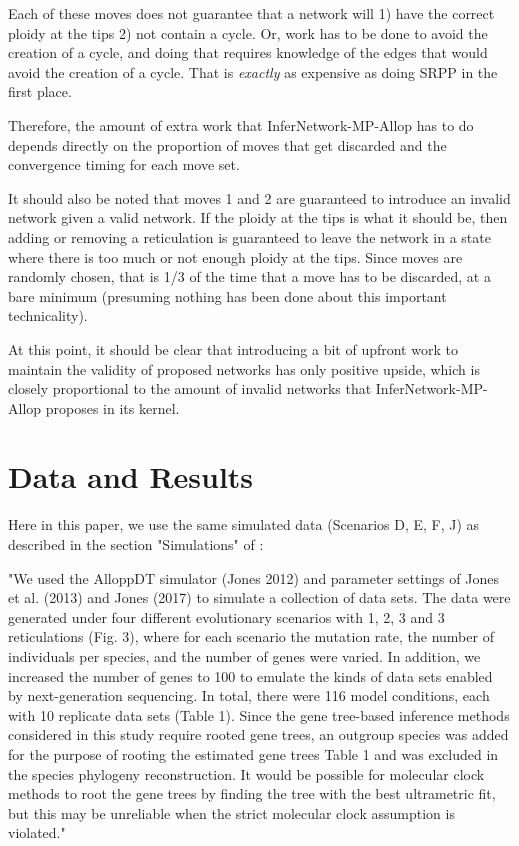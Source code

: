 \documentclass{article}
\begin{document}
Each of these moves does not guarantee that a network will 1) have the correct ploidy at the tips 2) not contain a cycle. Or, work has to be done to avoid the creation of a cycle, and doing that requires knowledge of the edges that would avoid the creation of a cycle. That is \textit{exactly} as expensive as doing SRPP in the first place.

Therefore, the amount of extra work that InferNetwork-MP-Allop has to do depends directly on the proportion of moves that get discarded and the convergence timing for each move set.

It should also be noted that moves 1 and 2 are guaranteed to introduce an invalid network given a valid network. If the ploidy at the tips is what it should be, then adding or removing a reticulation is guaranteed to leave the network in a state where there is too much or not enough ploidy at the tips. Since moves are randomly chosen, that is 1/3 of the time that a move has to be discarded, at a bare minimum (presuming nothing has been done about this important technicality).

At this point, it should be clear that introducing a bit of upfront work to maintain the validity of proposed networks has only positive upside, which is closely proportional to the amount of invalid networks that InferNetwork-MP-Allop proposes in its kernel.


\section{Data and Results}

Here in this paper, we use the same simulated data (Scenarios D, E, F, J) as described in the section "Simulations" of \cite{YanMP} :

"We used the AlloppDT simulator (Jones 2012) and parameter settings of Jones et al. (2013) and Jones (2017) to simulate a collection of data sets. The data were generated under four different evolutionary scenarios with 1, 2, 3 and 3 reticulations (Fig. 3), where for each scenario the mutation rate, the number of individuals per species, and the number of genes were varied. In addition, we increased the number of genes to 100 to emulate the kinds of data sets enabled by next-generation sequencing. In total, there were 116 model conditions, each with 10 replicate data sets (Table 1). Since the gene tree-based inference methods considered in this study require rooted gene trees, an outgroup species was added for the purpose of rooting the estimated gene trees Table 1 and was excluded in the species phylogeny reconstruction. It would be possible for molecular clock methods to root the gene trees by finding the tree with the best ultrametric fit, but this may be unreliable when the strict molecular clock assumption is violated."
\end{document}
